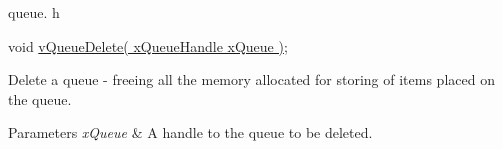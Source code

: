queue. h 
\begin{DoxyPre}void \hyperlink{queue_8h_a6b327259567005ab6f12a02feb8fdc7b}{vQueueDelete( xQueueHandle xQueue )};\end{DoxyPre}


Delete a queue -\/ freeing all the memory allocated for storing of items placed on the queue.


\begin{DoxyParams}{Parameters}
{\em x\-Queue} & A handle to the queue to be deleted. \\
\hline
\end{DoxyParams}
